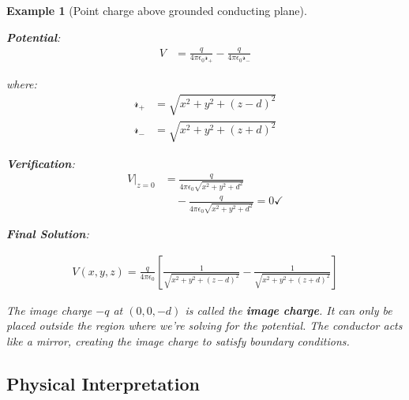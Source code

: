 \documentclass{article}
\newtheorem{example}[theorem]{Example}
\begin{document}
\begin{example}[Point charge above grounded conducting plane]
\begin{center}
\begin{minipage}{0.48\textwidth}
    \textbf{Potential}:
    \begin{align*}
        V &= \frac{q}{4\pi\epsilon_0 \mathcal{r}_+} - \frac{q}{4\pi\epsilon_0 \mathcal{r}_-}
    \end{align*}
    
    where:
    \begin{align*}
        \mathcal{r}_+ &= \sqrt{x^2+y^2+(z-d)^2} \\
        \mathcal{r}_- &= \sqrt{x^2+y^2+(z+d)^2}
    \end{align*}
    
    \textbf{Verification}:
    \begin{align*}
        V|_{z=0} &= \frac{q}{4\pi\epsilon_0\sqrt{x^2+y^2+d^2}} \\
        &\quad - \frac{q}{4\pi\epsilon_0\sqrt{x^2+y^2+d^2}} = 0 \checkmark
    \end{align*}
\end{minipage}
\end{center}

\textbf{Final Solution}:
\begin{conceptbox}
\begin{align*}
    V(x,y,z) = \frac{q}{4\pi\epsilon_0}\left[\frac{1}{\sqrt{x^2+y^2+(z-d)^2}} - \frac{1}{\sqrt{x^2+y^2+(z+d)^2}}\right]
\end{align*}
\end{conceptbox}

The image charge $-q$ at $(0,0,-d)$ is called the \textbf{image charge}. It can only be placed outside the region where we're solving for the potential. The conductor acts like a mirror, creating the image charge to satisfy boundary conditions.
\end{example}

\subsection{Physical Interpretation}

\begin{center}
\end{center}
\end{document}
